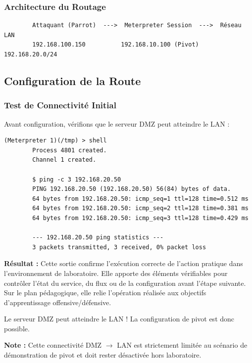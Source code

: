 \documentclass[12pt,a4paper,openany]{report}
\begin{document}
	\subsubsection{Architecture du Routage}
	
	\begin{verbatim}
		Attaquant (Parrot)  --->  Meterpreter Session  --->  Réseau LAN
		192.168.100.150          192.168.10.100 (Pivot)      192.168.20.0/24
	\end{verbatim}
	
	\subsection{Configuration de la Route}
	
	\subsubsection{Test de Connectivité Initial}
	
	Avant configuration, vérifions que le serveur DMZ peut atteindre le LAN :
	
	\begin{lstlisting}[caption=Test Ping depuis Meterpreter]
		(Meterpreter 1)(/tmp) > shell
		Process 4801 created.
		Channel 1 created.
		
		$ ping -c 3 192.168.20.50
		PING 192.168.20.50 (192.168.20.50) 56(84) bytes of data.
		64 bytes from 192.168.20.50: icmp_seq=1 ttl=128 time=0.512 ms
		64 bytes from 192.168.20.50: icmp_seq=2 ttl=128 time=0.381 ms
		64 bytes from 192.168.20.50: icmp_seq=3 ttl=128 time=0.429 ms
		
		--- 192.168.20.50 ping statistics ---
		3 packets transmitted, 3 received, 0% packet loss
	\end{lstlisting}
	
	\textbf{Résultat :} Cette sortie confirme l'exécution correcte de l'action pratique dans l'environnement de laboratoire. Elle apporte des éléments vérifiables pour contrôler l'état du service, du flux ou de la configuration avant l'étape suivante. Sur le plan pédagogique, elle relie l'opération réalisée aux objectifs d'apprentissage offensive/défensive.
	
	
	\textcolor{green}{\checkmark} Le serveur DMZ peut atteindre le LAN ! La configuration de pivot est donc possible.
	
	\textbf{Note :} Cette connectivité DMZ $\rightarrow$ LAN est strictement limitée au scénario de démonstration de pivot et doit rester désactivée hors laboratoire.
	
\end{document}

